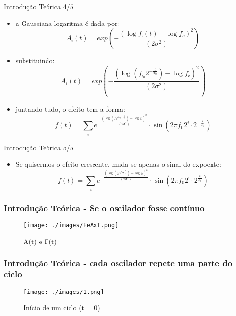 \documentclass{beamer}
\begin{document}
\begin{frame}{Introdução Teórica 4/5}
\begin{itemize}
\item a Gaussiana logaritma é dada por:
	\begin{equation}
		A_i(t) = exp(-\frac{(\log f_i(t) - \log f_c)^2}{(2\sigma^2)})
	\end{equation}
\item substituindo:
	\begin{equation}
		A_i(t) = exp(-\frac{(\log (f_{i_0} 2^{-\frac{t}{T_0}}) - \log f_c)^2}{(2\sigma^2)})
	\end{equation}

\item juntando tudo, o efeito tem a forma:
\begin{equation}
	f(t) = \sum_{i} e^{-\frac{(\log (f_0 2^i 2^{-\frac{t}{T_0}}) - \log f_c)^2}{(2\sigma^2)}} \cdot \sin(2 \pi f_0 2^i\cdot 2^{-\frac{t}{T_0}})
\end{equation}
\end{itemize}
\end{frame}

\begin{frame}{Introdução Teórica 5/5}
\begin{itemize}
\item Se quisermos o efeito crescente, muda-se apenas o sinal do expoente:
\begin{equation}
	f(t) = \sum_{i} e^{-\frac{(\log (f_0 2^i 2^{\frac{t}{T_0}}) - \log f_c)^2}{(2\sigma^2)}} \cdot \sin(2 \pi f_0 2^i\cdot 2^{\frac{t}{T_0}})
\end{equation}
\end{itemize}
\end{frame}

\begin{frame}
 \frametitle{Introdução Teórica - Se o oscilador fosse contínuo}
 \begin{figure}
  \texttt{[image: ./images/FeAxT.png]}
  \caption{A(t) e F(t)}
   \end{figure}
\end{frame}

\begin{frame}
 \frametitle{Introdução Teórica - cada oscilador repete uma parte do ciclo}
 \begin{figure}
  \texttt{[image: ./images/1.png]}
  \caption{Início de um ciclo (t = 0)}
   \end{figure}
\end{frame}
\end{document}
